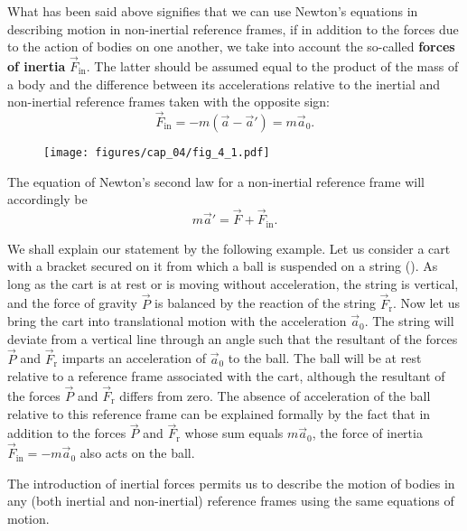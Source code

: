 What has been said above signifies that we can use Newton's equations in describing motion in non-inertial reference frames, if in addition to the forces due to the action of bodies on one another, we take into account the so-called \textbf{forces of inertia} $\vec{F}_{\text{in}}$. The latter should be assumed equal to the product of the mass of a body and the difference between its accelerations relative to the inertial and non-inertial reference frames taken with the opposite sign:
\begin{equation}\label{eq:4_2}
\vec{F}_{\text{in}} = -m(\vec{a} - \vec{a}') = m\vec{a}_0.
\end{equation}

\begin{figure}[t]
	\begin{center}
		\texttt{[image: figures/cap\_04/fig\_4\_1.pdf]}
		\caption[]{}
		\label{fig:4_1}
	\end{center}
\end{figure}

\noindent
The equation of Newton's second law for a non-inertial reference frame will accordingly be
\begin{equation}\label{eq:4_3}
m\vec{a}' = \vec{F} + \vec{F}_{\text{in}}.
\end{equation}

We shall explain our statement by the following example. Let us consider a cart with a bracket secured on it from which a ball is suspended on a string (). As long as the cart is at rest or is moving without acceleration, the string is vertical, and the force of gravity $\vec{P}$ is balanced by the reaction of the string $\vec{F}_{\text{r}}$. Now let us bring the cart into translational motion with the acceleration $\vec{a}_0$. The string will deviate from a vertical line through an angle such that the resultant of the forces $\vec{P}$ and $\vec{F}_{\text{r}}$ imparts an acceleration of $\vec{a}_0$ to the ball. The ball will be at rest relative to a reference frame associated with the cart, although the resultant of the forces $\vec{P}$ and $\vec{F}_{\text{r}}$ differs from zero. The absence of acceleration of the ball relative to this reference frame can be explained formally by the fact that in addition to the forces $\vec{P}$ and $\vec{F}_{\text{r}}$ whose sum equals $m\vec{a}_0$, the force of inertia $\vec{F}_{\text{in}}=-m\vec{a}_0$ also acts on the ball.

The introduction of inertial forces permits us to describe the motion of bodies in any (both inertial and non-inertial) reference frames using the same equations of motion.

